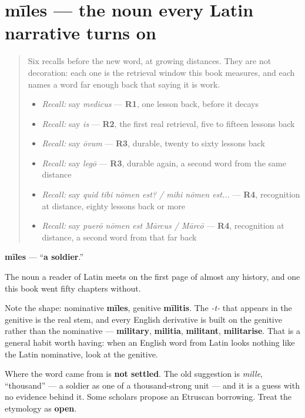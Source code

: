 \section[mīles, mīlitis]{mīles — the noun every Latin narrative turns on}

\label{lesson:LA-C51-miles}



\begin{quote}
Six recalls before the new word, at growing distances. They are not decoration: each one is the retrieval window this book measures, and each names a word far enough back that saying it is work.

\begin{itemize}
\raggedright
  \item \emph{Recall:} say \emph{medicus} — \textbf{R1}, one lesson back, before it decays
  \item \emph{Recall:} say \emph{is} — \textbf{R2}, the first real retrieval, five to fifteen lessons back
  \item \emph{Recall:} say \emph{ōvum} — \textbf{R3}, durable, twenty to sixty lessons back
  \item \emph{Recall:} say \emph{legō} — \textbf{R3}, durable again, a second word from the same distance
  \item \emph{Recall:} say \emph{quid tibi nōmen est? / mihi nōmen est...} — \textbf{R4}, recognition at distance, eighty lessons back or more
  \item \emph{Recall:} say \emph{puerō nōmen est Mārcus / Mārcō} — \textbf{R4}, recognition at distance, a second word from that far back
\end{itemize}
\end{quote}

\begin{cousinweb}
\textbf{mīles} — \textquotedblleft{}\textbf{a soldier}.\textquotedblright{}

The noun a reader of Latin meets on the first page of almost any history, and one this book went fifty chapters without.

Note the shape: nominative \textbf{mīles}, genitive \textbf{mīlitis}. The \emph{-t-} that appears in the genitive is the real stem, and every English derivative is built on the genitive rather than the nominative — \textbf{military}, \textbf{militia}, \textbf{militant}, \textbf{militarise}. That is a general habit worth having: when an English word from Latin looks nothing like the Latin nominative, look at the genitive.

Where the word came from is \textbf{not settled}. The old suggestion is \emph{mille}, \textquotedblleft{}thousand\textquotedblright{} — a soldier as one of a thousand-strong unit — and it is a guess with no evidence behind it. Some scholars propose an Etruscan borrowing. Treat the etymology as \textbf{open}.
\end{cousinweb}

